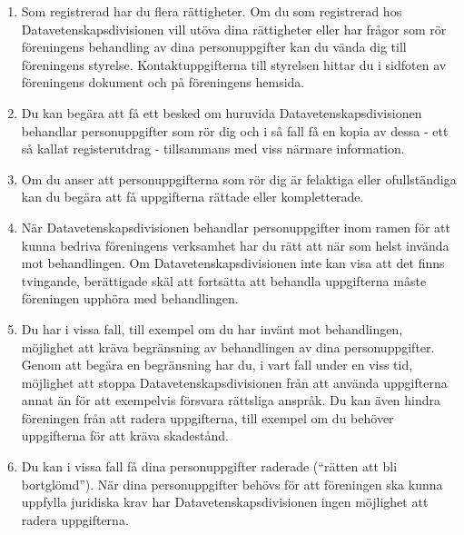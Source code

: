\documentclass{dvd}
\begin{document}
    \begin{enumerate}[label=\arabic* §, ref=\arabic*]
        \item Som registrerad har du flera rättigheter.
		Om du som registrerad hos Datavetenskapsdivisionen vill utöva dina rättigheter eller har frågor som rör föreningens behandling av dina personuppgifter kan du vända dig till föreningens styrelse.
		Kontaktuppgifterna till styrelsen hittar du i sidfoten av föreningens dokument och på föreningens hemsida.

        \item Du kan begära att få ett besked om huruvida Datavetenskapsdivisionen behandlar personuppgifter som rör dig och i så fall få en kopia av dessa - ett så kallat registerutdrag - tillsammans med viss närmare information.

        \item Om du anser att personuppgifterna som rör dig är felaktiga eller ofullständiga kan du begära att få uppgifterna rättade eller kompletterade.

        \item När Datavetenskapsdivisionen behandlar personuppgifter inom ramen för att kunna bedriva föreningens verksamhet har du rätt att när som helst invända mot behandlingen.
		Om Datavetenskapsdivisionen inte kan visa att det finns tvingande, berättigade skäl att fortsätta att behandla uppgifterna måste föreningen upphöra med behandlingen.

        \item Du har i vissa fall, till exempel om du har invänt mot behandlingen, möjlighet att kräva begränsning av behandlingen av dina personuppgifter.
		Genom att begära en begränsning har du, i vart fall under en viss tid, möjlighet att stoppa Datavetenskapsdivisionen från att använda uppgifterna annat än för att exempelvis försvara rättsliga anspråk.
		Du kan även hindra föreningen från att radera uppgifterna, till exempel om du behöver uppgifterna för att kräva skadestånd.

        \item Du kan i vissa fall få dina personuppgifter raderade (``rätten att bli bortglömd'').
		När dina personuppgifter behövs för att föreningen ska kunna uppfylla juridiska krav har Datavetenskapsdivisionen ingen möjlighet att radera uppgifterna.
    \end{enumerate}
\end{document}
